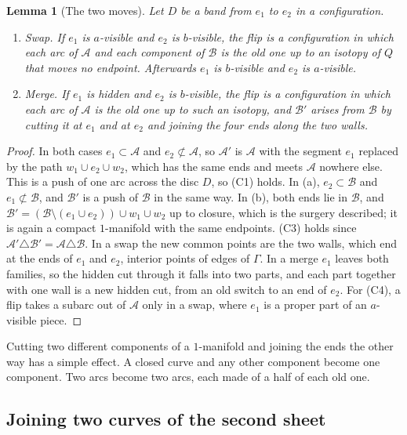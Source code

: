 \documentclass[11pt,a4paper]{article}
\newtheorem{lemma}[theorem]{Lemma}
\theoremstyle{definition}
\theoremstyle{remark}
\newcommand{\A}{\mathcal{A}}
\newcommand{\B}{\mathcal{B}}
\begin{document}
\begin{lemma}[The two moves]\label{lem:moves}
Let $D$ be a band from $e_1$ to $e_2$ in a configuration.
\begin{enumerate}[label=\textup{(\alph*)}]
\item \emph{Swap.} If $e_1$ is $a$-visible and $e_2$ is $b$-visible, the
  flip is a configuration in which each arc of $\A$ and each component of
  $\B$ is the old one up to an isotopy of $Q$ that moves no endpoint.
  Afterwards $e_1$ is $b$-visible and $e_2$ is $a$-visible.
\item \emph{Merge.} If $e_1$ is hidden and $e_2$ is $b$-visible, the flip
  is a configuration in which each arc of $\A$ is the old one up to such an
  isotopy, and $\B'$ arises from $\B$ by cutting it at $e_1$ and at $e_2$
  and joining the four ends along the two walls.
\end{enumerate}
\end{lemma}
\begin{proof}
In both cases $e_1\subset\A$ and $e_2\not\subset\A$, so $\A'$ is $\A$ with
the segment $e_1$ replaced by the path $w_1\cup e_2\cup w_2$, which has the
same ends and meets $\A$ nowhere else. This is a push of one arc across the
disc $D$, so (C1) holds. In (a), $e_2\subset\B$ and $e_1\not\subset\B$, and
$\B'$ is a push of $\B$ in the same way. In (b), both ends lie in $\B$, and
$\B'=(\B\setminus(e_1\cup e_2))\cup w_1\cup w_2$ up to closure, which is the
surgery described; it is again a compact $1$-manifold with the same
endpoints. (C3) holds since $\A'\triangle\B'=\A\triangle\B$. In a swap the new
common points are the two walls, which end at the ends of $e_1$ and $e_2$,
interior points of edges of $\Gamma$. In a merge $e_1$ leaves both
families, so the hidden cut through it falls into two parts, and each part
together with one wall is a new hidden cut, from an old switch to an end
of $e_2$. For (C4), a flip takes a subarc out of
$\A$ only in a swap, where $e_1$ is a proper part of an $a$-visible piece.
\end{proof}

Cutting two different components of a $1$-manifold and joining the ends the
other way has a simple effect. A closed curve and any other component
become one component. Two arcs become two arcs, each made of a half of
each old one.

\subsection{Joining two curves of the second sheet}
\end{document}
